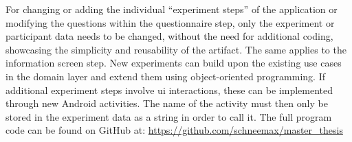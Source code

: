 

For changing or adding the individual \enquote{experiment steps} of the application or modifying the questions within the questionnaire step, only the experiment or participant data needs to be changed, without the need for additional coding, showcasing the simplicity and reusability of the artifact. The same applies to the information screen step. New experiments can build upon the existing use cases in the domain layer and extend them using object-oriented programming. If additional experiment steps involve \ac{ui} interactions, these can be implemented through new Android activities. The name of the activity must then only be stored in the experiment data as a string in order to call it. The full program code can be found on GitHub at: \url{https://github.com/schneemax/master_thesis}
